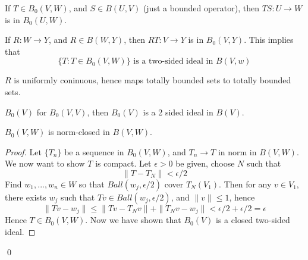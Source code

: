 \begin{proposition}
    If $T\in B_0(V,W)$, and $S\in B(U,V)$ (just a bounded operator), then $TS: U\to W$ is in $B_0(U,W)$.

    If $R: W\to Y$, and $R\in B(W,Y)$, then $RT: V\to Y$ is in $B_0(V,Y)$. This implies that 
    \begin{equation*}
        \{T: T\in B_0(V,W) \} \text{ is a two-sided ideal in } B(V,w)
    \end{equation*}
\end{proposition}
\begin{note}
    $R$ is uniformly coninuous, hence maps totally bounded sets to totally bounded sets.
\end{note}
\begin{note}
    $B_0(V)$ for $B_0(V,V)$, then $B_0(V)$ is a 2 sided ideal in $B(V)$.
\end{note}
\begin{proposition}
    $B_0(V,W)$ is norm-closed in $B(V,W)$.
\end{proposition}
\begin{proof}
    Let $\{T_n\}$ be a sequence in $B_0(V,W)$, and $T_n\to T$ in norm in $B(V,W)$. We now want to show $T$ is compact. Let $\epsilon>0$ be given, choose $N$ such that
    \begin{equation*}
        \|T-T_N\|<\epsilon/2
    \end{equation*}
    Find $w_1, ..., w_n\in W$ so that $Ball(w_j, \epsilon/2)$ cover $T_N(V_1)$. Then for any $v\in V_1$, there exists $w_j$ such that $Tv\in Ball(w_j, \epsilon/2)$, and $\|v\|\leq 1$, hence
    \begin{equation*}
        \|Tv-w_j\|\leq \|Tv-T_Nv\|+\|T_Nv-w_j\|<\epsilon/2+\epsilon/2=\epsilon
    \end{equation*}
    Hence $T\in B_0(V,W)$. Now we have shown that $B_0(V)$ is a closed two-sided ideal.
\end{proof}
\qed

